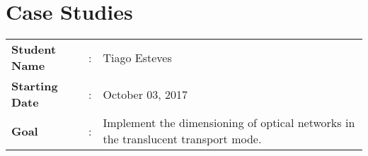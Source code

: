 
\chapter{Case Studies}

\begin{tcolorbox}	
\begin{tabular}{p{2.75cm} p{0.2cm} p{10.5cm}} 	
\textbf{Student Name}  &:& Tiago Esteves\\
\textbf{Starting Date} &:& October 03, 2017\\
\textbf{Goal}          &:& Implement the dimensioning of optical networks in the translucent transport mode.
\end{tabular}
\end{tcolorbox}





